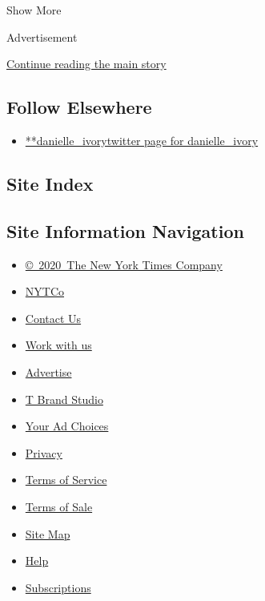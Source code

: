 Show More

Advertisement

\protect\hyperlink{after-mid2}{Continue reading the main story}

\hypertarget{follow-elsewhere}{%
\subsection{Follow Elsewhere}\label{follow-elsewhere}}

\begin{itemize}
\tightlist
\item
  \href{https://twitter.com/danielle_ivory}{**danielle\_ivorytwitter
  page for danielle\_ivory}
\end{itemize}

\hypertarget{site-index}{%
\subsection{Site Index}\label{site-index}}

\hypertarget{site-information-navigation}{%
\subsection{Site Information
Navigation}\label{site-information-navigation}}

\begin{itemize}
\tightlist
\item
  \href{https://help.nytimes3xbfgragh.onion/hc/en-us/articles/115014792127-Copyright-notice}{©~2020~The
  New York Times Company}
\end{itemize}

\begin{itemize}
\tightlist
\item
  \href{https://www.nytco.com/}{NYTCo}
\item
  \href{https://help.nytimes3xbfgragh.onion/hc/en-us/articles/115015385887-Contact-Us}{Contact
  Us}
\item
  \href{https://www.nytco.com/careers/}{Work with us}
\item
  \href{https://nytmediakit.com/}{Advertise}
\item
  \href{http://www.tbrandstudio.com/}{T Brand Studio}
\item
  \href{https://www.nytimes3xbfgragh.onion/privacy/cookie-policy\#how-do-i-manage-trackers}{Your
  Ad Choices}
\item
  \href{https://www.nytimes3xbfgragh.onion/privacy}{Privacy}
\item
  \href{https://help.nytimes3xbfgragh.onion/hc/en-us/articles/115014893428-Terms-of-service}{Terms
  of Service}
\item
  \href{https://help.nytimes3xbfgragh.onion/hc/en-us/articles/115014893968-Terms-of-sale}{Terms
  of Sale}
\item
  \href{https://spiderbites.nytimes3xbfgragh.onion}{Site Map}
\item
  \href{https://help.nytimes3xbfgragh.onion/hc/en-us}{Help}
\item
  \href{https://www.nytimes3xbfgragh.onion/subscription?campaignId=37WXW}{Subscriptions}
\end{itemize}
